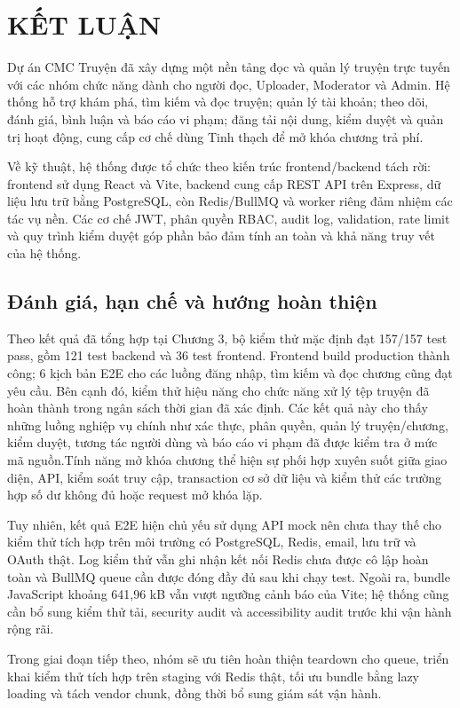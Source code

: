 \chapter*{KẾT LUẬN}

Dự án CMC Truyện đã xây dựng một nền tảng đọc và quản lý truyện trực tuyến với các nhóm chức năng dành cho người đọc, Uploader, Moderator và Admin. Hệ thống hỗ trợ khám phá, tìm kiếm và đọc truyện; quản lý tài khoản; theo dõi, đánh giá, bình luận và báo cáo vi phạm; đăng tải nội dung, kiểm duyệt và quản trị hoạt động, cung cấp cơ chế dùng Tinh thạch để mở khóa chương trả phí.

Về kỹ thuật, hệ thống được tổ chức theo kiến trúc frontend/backend tách rời: frontend sử dụng React và Vite, backend cung cấp REST API trên Express, dữ liệu lưu trữ bằng PostgreSQL, còn Redis/BullMQ và worker riêng đảm nhiệm các tác vụ nền. Các cơ chế JWT, phân quyền RBAC, audit log, validation, rate limit và quy trình kiểm duyệt góp phần bảo đảm tính an toàn và khả năng truy vết của hệ thống.

\section*{Đánh giá, hạn chế và hướng hoàn thiện}

Theo kết quả đã tổng hợp tại Chương 3, bộ kiểm thử mặc định đạt 157/157 test pass, gồm 121 test backend và 36 test frontend. Frontend build production thành công; 6 kịch bản E2E cho các luồng đăng nhập, tìm kiếm và đọc chương cũng đạt yêu cầu. Bên cạnh đó, kiểm thử hiệu năng cho chức năng xử lý tệp truyện đã hoàn thành trong ngân sách thời gian đã xác định. Các kết quả này cho thấy những luồng nghiệp vụ chính như xác thực, phân quyền, quản lý truyện/chương, kiểm duyệt, tương tác người dùng và báo cáo vi phạm đã được kiểm tra ở mức mã nguồn.Tính năng mở khóa chương thể hiện sự phối hợp xuyên suốt giữa giao diện, API, kiểm soát truy cập, transaction cơ sở dữ liệu và kiểm thử các trường hợp số dư không đủ hoặc request mở khóa lặp.

Tuy nhiên, kết quả E2E hiện chủ yếu sử dụng API mock nên chưa thay thế cho kiểm thử tích hợp trên môi trường có PostgreSQL, Redis, email, lưu trữ và OAuth thật. Log kiểm thử vẫn ghi nhận kết nối Redis chưa được cô lập hoàn toàn và BullMQ queue cần được đóng đầy đủ sau khi chạy test. Ngoài ra, bundle JavaScript khoảng 641,96 kB vẫn vượt ngưỡng cảnh báo của Vite; hệ thống cũng cần bổ sung kiểm thử tải, security audit và accessibility audit trước khi vận hành rộng rãi.

Trong giai đoạn tiếp theo, nhóm sẽ ưu tiên hoàn thiện teardown cho queue, triển khai kiểm thử tích hợp trên staging với Redis thật, tối ưu bundle bằng lazy loading và tách vendor chunk, đồng thời bổ sung giám sát vận hành.